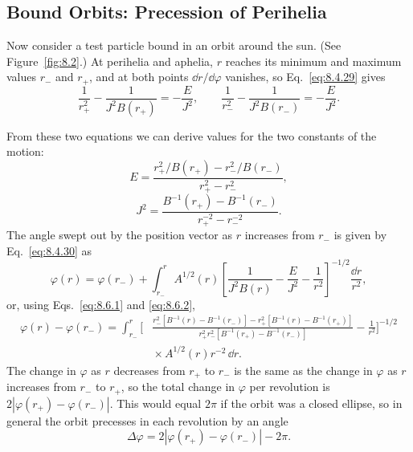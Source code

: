 
\subsection{Bound Orbits: Precession of Perihelia}\label{sec:8.6}

Now consider a test particle bound in an orbit around the sun. (See
Figure~\ref{fig:8.2}.) At perihelia and aphelia, \(r\) reaches its minimum
and maximum values \(r_-\) and \(r_+\), and at both points
\(\dd r/\dd\varphi\) vanishes, so Eq.~\eqref{eq:8.4.29} gives
\[
  \frac{1}{r_+^2}-\frac{1}{J^2B(r_+)}=-\frac{E}{J^2},
  \qquad
  \frac{1}{r_-^2}-\frac{1}{J^2B(r_-)}=-\frac{E}{J^2}.
\]



From these two equations we can derive values for the two constants of the
motion:
\begin{equation}
  E
  =
  \frac{r_+^2/B(r_+)-r_-^2/B(r_-)}
       {r_+^2-r_-^2},
  \tag{8.6.1}\label{eq:8.6.1}
\end{equation}
\begin{equation}
  J^2
  =
  \frac{B^{-1}(r_+)-B^{-1}(r_-)}
       {r_+^{-2}-r_-^{-2}}.
  \tag{8.6.2}\label{eq:8.6.2}
\end{equation}
The angle swept out by the position vector as \(r\) increases from \(r_-\)
is given by Eq.~\eqref{eq:8.4.30} as
\[
  \varphi(r)
  =
  \varphi(r_-)
  +\int_{r_-}^{r}
  A^{1/2}(r)
  \left[
    \frac{1}{J^2B(r)}-\frac{E}{J^2}-\frac{1}{r^2}
  \right]^{-1/2}\frac{\dd r}{r^2},
\]
or, using Eqs.~\eqref{eq:8.6.1} and \eqref{eq:8.6.2},
\begin{equation}
  \begin{split}
  \varphi(r)-\varphi(r_-)
  =\int_{r_-}^{r}
  \biggl[
  &\frac{
    r_-^2\!\left[B^{-1}(r)-B^{-1}(r_-)\right]
    -r_+^2\!\left[B^{-1}(r)-B^{-1}(r_+)\right]
  }{
    r_+^2r_-^2\!\left[B^{-1}(r_+)-B^{-1}(r_-)\right]
  }
  -\frac{1}{r^2}
  \biggr]^{-1/2}\\
  &{}\times A^{1/2}(r)r^{-2}\,\dd r.
  \end{split}
  \tag{8.6.3}\label{eq:8.6.3}
\end{equation}
The change in \(\varphi\) as \(r\) decreases from \(r_+\) to \(r_-\) is
the same as the change in \(\varphi\) as \(r\) increases from \(r_-\) to
\(r_+\), so the total change in \(\varphi\) per revolution is
\(2|\varphi(r_+)-\varphi(r_-)|\). This would equal \(2\pi\) if the orbit
was a closed ellipse, so in general the orbit precesses in each revolution
by an angle
\begin{equation}
  \Delta\varphi
  =
  2|\varphi(r_+)-\varphi(r_-)|-2\pi.
  \tag{8.6.4}\label{eq:8.6.4}
\end{equation}

